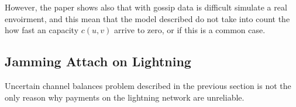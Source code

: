 However, the paper shows also that with gossip data is difficult simulate 
a real envoirment, and this mean that the model described do not take into 
count the how fast an capacity $c(u, v)$ arrive to zero, or if this is a 
common case.

\subsection{Jamming Attach on Lightning}

Uncertain channel balances problem described in the previous section 
is not the only reason why payments on the lightning network are unreliable. 

